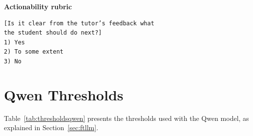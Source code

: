\documentclass[11pt]{article}
\newcommand{\todo}[1]{\textcolor{blue}{\textbf{\small [TODO: #1]}}}
\begin{document}
\noindent\textbf{Actionability rubric}

\begin{verbatim}
[Is it clear from the tutor’s feedback what
the student should do next?]
1) Yes
2) To some extent
3) No
\end{verbatim}

\section{Qwen Thresholds}
\label{sec:appendix_thresholds}

Table~\ref{tab:thresholdsqwen} presents the thresholds used with the Qwen model, as explained in Section~\ref{sec:ftllm}.

\begin{table}[h!]
\centering
{}
\caption{Threshold-based classification rules for each evaluation dimension using Qwen. TSE = "To some extent".}
\label{tab:thresholdsqwen}
\end{table}


\end{document}

